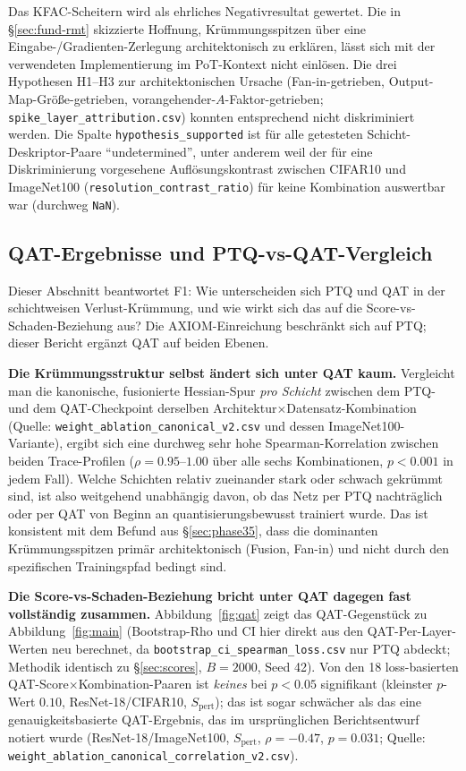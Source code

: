 Das KFAC-Scheitern wird als ehrliches Negativresultat gewertet. Die in \S\ref{sec:fund-rmt} skizzierte Hoffnung, Krümmungsspitzen über eine Eingabe-/Gradienten-Zerlegung architektonisch zu erklären, lässt sich mit der verwendeten Implementierung im PoT-Kontext nicht einlösen. Die drei Hypothesen H1--H3 zur architektonischen Ursache (Fan-in-getrieben, Output-Map-Größe-getrieben, vorangehender-$A$-Faktor-getrieben; \texttt{spike\_layer\_attribution.csv}) konnten entsprechend nicht diskriminiert werden. Die Spalte \texttt{hypothesis\_supported} ist für alle getesteten Schicht-Deskriptor-Paare \enquote{undetermined}, unter anderem weil der für eine Diskriminierung vorgesehene Auflösungskontrast zwischen CIFAR10 und ImageNet100 (\texttt{resolution\_contrast\_ratio}) für keine Kombination auswertbar war (durchweg \texttt{NaN}).

\subsection{QAT-Ergebnisse und PTQ-vs-QAT-Vergleich}
\label{sec:phase9}

Dieser Abschnitt beantwortet F1: Wie unterscheiden sich PTQ und QAT in der schichtweisen Verlust-Krümmung, und wie wirkt sich das auf die Score-vs-Schaden-Beziehung aus? Die AXIOM-Einreichung beschränkt sich auf PTQ; dieser Bericht ergänzt QAT auf beiden Ebenen.

\textbf{Die Krümmungsstruktur selbst ändert sich unter QAT kaum.} Vergleicht man die kanonische, fusionierte Hessian-Spur \emph{pro Schicht} zwischen dem PTQ- und dem QAT-Checkpoint derselben Architektur$\times$Datensatz-Kombination (Quelle: \texttt{weight\_ablation\_canonical\_v2.csv} und dessen ImageNet100-Variante), ergibt sich eine durchweg sehr hohe Spearman-Korrelation zwischen beiden Trace-Profilen ($\rho=0.95$--$1.00$ über alle sechs Kombinationen, $p<0.001$ in jedem Fall). Welche Schichten relativ zueinander stark oder schwach gekrümmt sind, ist also weitgehend unabhängig davon, ob das Netz per PTQ nachträglich oder per QAT von Beginn an quantisierungsbewusst trainiert wurde. Das ist konsistent mit dem Befund aus \S\ref{sec:phase35}, dass die dominanten Krümmungsspitzen primär architektonisch (Fusion, Fan-in) und nicht durch den spezifischen Trainingspfad bedingt sind.

\textbf{Die Score-vs-Schaden-Beziehung bricht unter QAT dagegen fast vollständig zusammen.} Abbildung~\ref{fig:qat} zeigt das QAT-Gegenstück zu Abbildung~\ref{fig:main} (Bootstrap-Rho und CI hier direkt aus den QAT-Per-Layer-Werten neu berechnet, da \texttt{bootstrap\_ci\_spearman\_loss.csv} nur PTQ abdeckt; Methodik identisch zu \S\ref{sec:scores}, $B=2000$, Seed 42). Von den 18 loss-basierten QAT-Score$\times$Kombination-Paaren ist \emph{keines} bei $p<0.05$ signifikant (kleinster $p$-Wert $0.10$, ResNet-18/CIFAR10, $S_{\mathrm{pert}}$); das ist sogar schwächer als das eine genauigkeitsbasierte QAT-Ergebnis, das im ursprünglichen Berichtsentwurf notiert wurde (ResNet-18/ImageNet100, $S_{\mathrm{pert}}$, $\rho=-0.47$, $p=0.031$; Quelle: \texttt{weight\_ablation\_canonical\_correlation\_v2.csv}).

